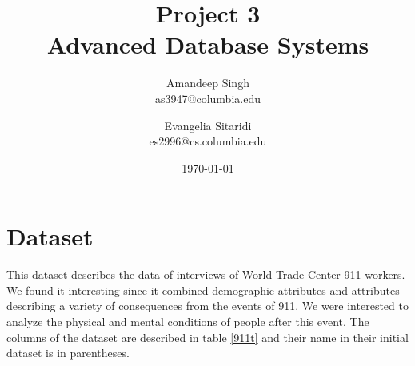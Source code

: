 \documentclass[11pt]{article}
\title{Project 3 \\ Advanced Database Systems \\}
\author{
Amandeep Singh\\as3947@columbia.edu
\and
Evangelia Sitaridi \\ es2996@cs.columbia.edu
}
\date{\today}
\begin{document}
\maketitle


\section{Dataset}
This dataset \cite{911d} describes the data of interviews of World Trade Center 911 workers. We found it interesting since it combined demographic attributes and attributes
describing a variety of consequences from the events of 911. We  were interested to analyze the physical and mental conditions of people after this event. The columns of the dataset are described in table \ref{911t} and their name in their initial dataset is in parentheses.
\end{document}
